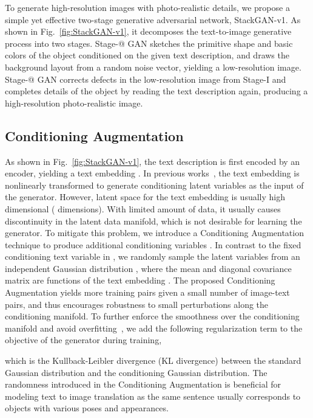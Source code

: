 \documentclass[10pt,journal,letterpaper,compsoc]{IEEEtran}
\makeatletter
\newcommand{\Rmnum}[1]{\expandafter\@slowromancap\romannumeral #1@}
\makeatother
\begin{document}
To generate high-resolution images with photo-realistic details, we propose a simple yet effective two-stage generative adversarial network, StackGAN-v1. As shown in Fig.~\ref{fig:StackGAN-v1}, it decomposes the text-to-image generative process into two stages.   Stage-\Rmnum{1} GAN sketches the primitive shape and basic colors of the object conditioned on the given text description, and draws the background layout from a random noise vector, yielding a low-resolution image.   Stage-\Rmnum{2} GAN corrects defects in the low-resolution image from Stage-I and completes details of the object by reading the text description again, producing a high-resolution photo-realistic image. 


\subsection{Conditioning Augmentation}
As shown in Fig.~\ref{fig:StackGAN-v1}, the text description  is first encoded by an encoder, yielding a text embedding . In previous works~\cite{reed2016generative,reed2016learning}, the text embedding is nonlinearly transformed to generate conditioning latent variables as the input of the generator. However, latent space for the text embedding is usually high dimensional ( dimensions). With limited amount of data, it usually causes discontinuity in the latent data manifold, which is not desirable for learning the generator. To mitigate this problem, we introduce a Conditioning Augmentation technique to produce additional conditioning variables . In contrast to the fixed conditioning text variable  in \cite{reed2016generative,reed2016learning}, we randomly sample the latent variables  from an independent Gaussian distribution , where the mean  and diagonal covariance matrix  are functions of the text embedding . The proposed Conditioning Augmentation yields more training pairs given a small number of image-text pairs, and thus encourages robustness to small perturbations along the conditioning manifold. To further enforce the smoothness over the conditioning manifold and avoid overfitting~\cite{Doersch16, LarsenSLW16}, we add the following regularization term to the objective of the generator during training, 

which is the Kullback-Leibler divergence (KL divergence) between the standard Gaussian distribution and the conditioning Gaussian distribution. The randomness introduced in the Conditioning Augmentation is beneficial for modeling text to image translation as the same sentence usually corresponds to objects with various poses and appearances. 
\end{document}
